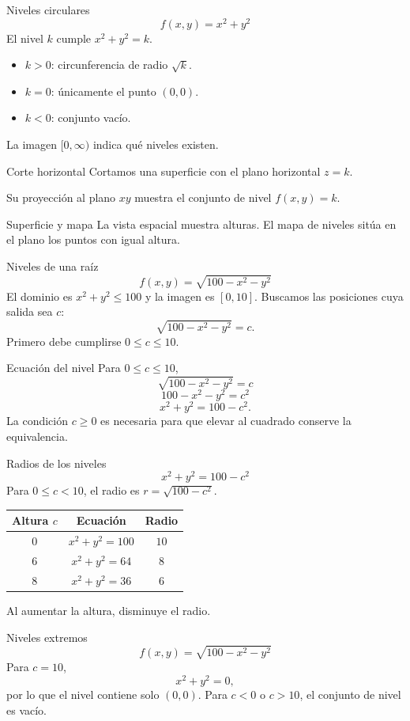 \begin{frame}{Niveles circulares}
\[f(x,y)=x^2+y^2\]
El nivel $k$ cumple $x^2+y^2=k$.
\begin{itemize}
\item $k>0$: circunferencia de radio $\sqrt k$.
\item $k=0$: únicamente el punto $(0,0)$.
\item $k<0$: conjunto vacío.
\end{itemize}
La imagen $[0,\infty)$ indica qué niveles existen.
\end{frame}
\begin{frame}{Corte horizontal}
Cortamos una superficie con el plano horizontal $z=k$.

Su proyección al plano $xy$ muestra el conjunto de nivel $f(x,y)=k$.
\end{frame}
\begin{frame}{Superficie y mapa}
La vista espacial muestra alturas. El mapa de niveles sitúa en el plano los puntos con igual altura.
\end{frame}
\begin{frame}{Niveles de una raíz}
\[f(x,y)=\sqrt{100-x^2-y^2}\]
El dominio es $x^2+y^2\le100$ y la imagen es $[0,10]$.
\medskip
Buscamos las posiciones cuya salida sea $c$:
\[\sqrt{100-x^2-y^2}=c.\]
Primero debe cumplirse $0\le c\le10$.
\end{frame}
\begin{frame}{Ecuación del nivel}
Para $0\le c\le10$,
\[\sqrt{100-x^2-y^2}=c\]
\[100-x^2-y^2=c^2\]
\[\boxed{x^2+y^2=100-c^2}.\]
La condición $c\ge0$ es necesaria para que elevar al cuadrado conserve la equivalencia.
\end{frame}
\begin{frame}{Radios de los niveles}
\[x^2+y^2=100-c^2\]
Para $0\le c<10$, el radio es $r=\sqrt{100-c^2}$.
\begin{center}\begin{tabular}{ccc}
Altura $c$ & Ecuación & Radio\\\hline
$0$ & $x^2+y^2=100$ & $10$\\[2mm]
$6$ & $x^2+y^2=64$ & $8$\\[2mm]
$8$ & $x^2+y^2=36$ & $6$
\end{tabular}\end{center}
Al aumentar la altura, disminuye el radio.
\end{frame}
\begin{frame}{Niveles extremos}
\[f(x,y)=\sqrt{100-x^2-y^2}\]
Para $c=10$,
\[x^2+y^2=0,\]
por lo que el nivel contiene solo $(0,0)$.
\medskip
Para $c<0$ o $c>10$, el conjunto de nivel es vacío.
\end{frame}
